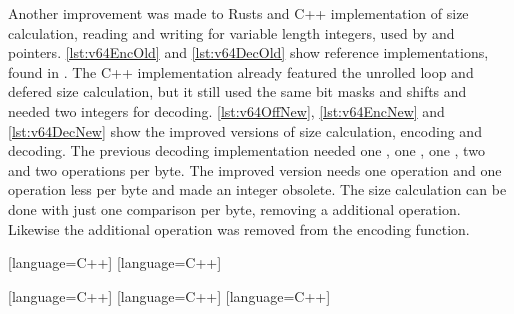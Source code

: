 \documentclass[thesis]{subfiles}
\begin{document}
  Another improvement was made to Rusts and C++ implementation of size calculation, reading and writing for variable length integers, used by  and pointers.
  \autoref{lst:v64EncOld} and \autoref{lst:v64DecOld} show reference implementations, found in \autocite{skill-tr}.
  The C++ implementation already featured the unrolled loop and defered size calculation, but it still used the same bit masks and shifts and needed two integers for decoding.
  \autoref{lst:v64OffNew}, \autoref{lst:v64EncNew} and \autoref{lst:v64DecNew} show the improved versions of size calculation, encoding and decoding.
  The previous decoding implementation needed one , one , one , two  and two  operations per byte.
  The improved version needs one  operation and one  operation less per byte and made an integer obsolete.
  The size calculation can be done with just one comparison per byte, removing a additional  operation.
  Likewise the additional  operation was removed from the encoding function.

  [language=C++]
  [language=C++]


  [language=C++]
  [language=C++]
  [language=C++]
\end{document}
